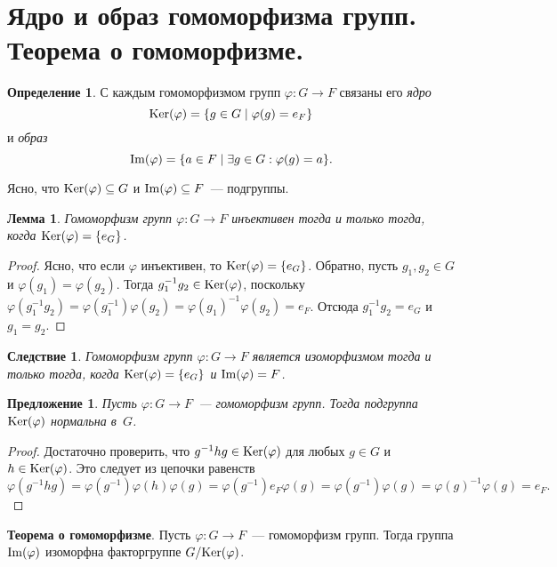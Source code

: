 \documentclass[a4paper, 12pt]{article}
\def\Ker{{\rm Ker}}%
\def\Im{{\rm Im}}%
\newtheorem{proposition}{Предложение}
\newtheorem{lemma}{Лемма}
\newtheorem{corollary}{Следствие}
\theoremstyle{definition}
\newtheorem{definition}{Определение}
\theoremstyle{remark}
\begin{document}
\section{Ядро и образ гомоморфизма групп. Теорема о гомоморфизме.}

\begin{definition}
С каждым гомоморфизмом групп $\varphi\colon G\to F$ связаны его {\it
ядро}
$$
\Ker(\varphi)=\{g\in G \mid \varphi(g)=e_F\}
$$
и {\it образ}
$$
\Im(\varphi)=\{a\in F \mid \exists g\in G : \varphi(g)=a\}.
$$
\end{definition}

Ясно, что $\Ker(\varphi)\subseteq G$ и $\Im(\varphi)\subseteq F$~---
подгруппы.

\begin{lemma}
Гомоморфизм групп $\varphi \colon G \to F$ инъективен тогда и только
тогда, когда $\Ker(\varphi) = \{e_G\}$.
\end{lemma}
\vspace{-3mm}
\begin{proof}
Ясно, что если $\varphi$ инъективен, то $\Ker(\varphi) = \lbrace e_G
\rbrace$. Обратно, пусть $g_1, g_2 \in G$ и $\varphi(g_1) =
\varphi(g_2)$. Тогда $g_1^{-1} g_2 \in \Ker(\varphi)$, поскольку
$\varphi(g_1^{-1} g_2) = \varphi(g_1^{-1}) \varphi(g_2) =
\varphi(g_1)^{-1} \varphi (g_2) = e_F$. Отсюда $g_1^{-1}g_2 = e_G$ и
$g_1 = g_2$.
\end{proof}

\begin{corollary}
Гомоморфизм групп $\varphi\colon G\to F$ является изоморфизмом тогда
и только тогда, когда $\Ker(\varphi)=\{e_G\}$ и $\Im(\varphi)=F$.
\end{corollary}

\begin{proposition}
Пусть $\varphi \colon G \to F$~--- гомоморфизм групп. Тогда
подгруппа $\Ker(\varphi)$ нормальна в~$G$.
\end{proposition}
\vspace{-3mm}
\begin{proof}
Достаточно проверить, что $g^{-1}hg \in \Ker(\varphi)$ для любых
$g\in G$ и $h \in \Ker(\varphi)$. Это следует из цепочки равенств
$$
\varphi(g^{-1}hg) = \varphi(g^{-1}) \varphi(h) \varphi(g) =
\varphi(g^{-1}) e_F \varphi(g) = \varphi(g^{-1}) \varphi(g) =
\varphi(g)^{-1} \varphi (g) = e_F.
$$
\end{proof}

{\bf Теорема о гомоморфизме}. Пусть $\varphi\colon G\to F$~---
гомоморфизм групп. Тогда группа $\Im(\varphi)$ изоморфна
факторгруппе $G/\Ker(\varphi)$.
\end{document}
